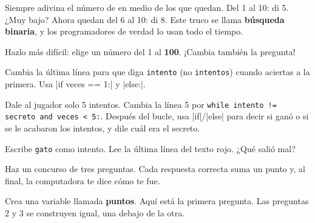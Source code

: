 \begin{think}
Siempre adivina el número de en medio de los que quedan. Del 1 al 10: di 5. ¿Muy bajo? Ahora quedan del 6 al 10: di 8. Este truco se llama \textbf{búsqueda binaria}, y los programadores de verdad lo usan todo el tiempo.
\end{think}

\begin{challenge}
\tick Hazlo más difícil: elige un número del 1 al \textbf{100}. ¡Cambia también la pregunta!\par
\tick Cambia la última línea para que diga \texttt{intento} (no \texttt{intentos}) cuando aciertas a la primera. Usa \py|if veces == 1:| y \py|else:|.\par
\tick Dale al jugador solo 5 intentos. Cambia la línea 5 por \texttt{while intento != secreto and veces < 5:}. Después del bucle, usa \py|if|/\py|else| para decir si ganó o si se le acabaron los intentos, y dile cuál era el secreto.\par
\tick Escribe \texttt{gato} como intento. Lee la última línea del texto rojo. ¿Qué salió mal?
\end{challenge}


Haz un concurso de tres preguntas. Cada respuesta correcta suma un punto y, al final, la computadora te dice cómo te fue.

Crea una variable llamada \textbf{puntos}. Aquí está la primera pregunta. Las preguntas 2 y 3 se construyen igual, una debajo de la otra.

\begin{center}
\begin{scratch}
\blockspace[0.6]
\end{scratch}
\end{center}

